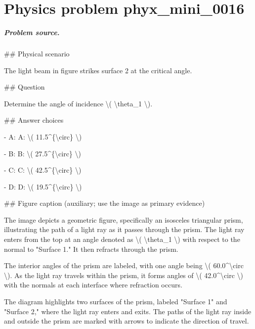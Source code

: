 
\chapter{Physics problem phyx\_mini\_0016}
\label{ch:PhyXMiniProblems_problem_phyx_mini_0016}

\paragraph{Problem source.}
\#\# Physical scenario

The light beam in figure strikes surface 2 at the critical angle.

\#\# Question

Determine the angle of incidence \textbackslash{}( \textbackslash{}theta\_1 \textbackslash{}).

\#\# Answer choices

- A: A: \textbackslash{}( 11.5\textasciicircum{}\{\textbackslash{}circ\} \textbackslash{})

- B: B: \textbackslash{}( 27.5\textasciicircum{}\{\textbackslash{}circ\} \textbackslash{})

- C: C: \textbackslash{}( 42.5\textasciicircum{}\{\textbackslash{}circ\} \textbackslash{})

- D: D: \textbackslash{}( 19.5\textasciicircum{}\{\textbackslash{}circ\} \textbackslash{})

\#\# Figure caption (auxiliary; use the image as primary evidence)

The image depicts a geometric figure, specifically an isosceles triangular prism, illustrating the path of a light ray as it passes through the prism. The light ray enters from the top at an angle denoted as \textbackslash{}( \textbackslash{}theta\_1 \textbackslash{}) with respect to the normal to "Surface 1." It then refracts through the prism.

The interior angles of the prism are labeled, with one angle being \textbackslash{}( 60.0\textasciicircum{}\textbackslash{}circ \textbackslash{}). As the light ray travels within the prism, it forms angles of \textbackslash{}( 42.0\textasciicircum{}\textbackslash{}circ \textbackslash{}) with the normals at each interface where refraction occurs.

The diagram highlights two surfaces of the prism, labeled "Surface 1" and "Surface 2," where the light ray enters and exits. The paths of the light ray inside and outside the prism are marked with arrows to indicate the direction of travel.

